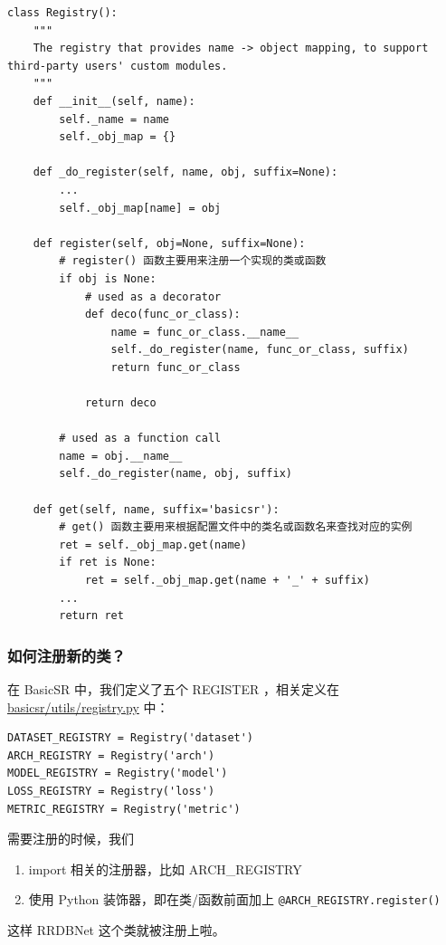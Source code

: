 \documentclass[../main.tex]{subfiles}
\begin{document}
\begin{verbatim}
class Registry():
    """
    The registry that provides name -> object mapping, to support third-party users' custom modules.
    """
    def __init__(self, name):
        self._name = name
        self._obj_map = {}

    def _do_register(self, name, obj, suffix=None):
        ...
        self._obj_map[name] = obj

    def register(self, obj=None, suffix=None):
        # register() 函数主要用来注册一个实现的类或函数
        if obj is None:
            # used as a decorator
            def deco(func_or_class):
                name = func_or_class.__name__
                self._do_register(name, func_or_class, suffix)
                return func_or_class

            return deco

        # used as a function call
        name = obj.__name__
        self._do_register(name, obj, suffix)

    def get(self, name, suffix='basicsr'):
        # get() 函数主要用来根据配置文件中的类名或函数名来查找对应的实例
        ret = self._obj_map.get(name)
        if ret is None:
            ret = self._obj_map.get(name + '_' + suffix)
        ...
        return ret
\end{verbatim}

\subsubsection{如何注册新的类？}

在 BasicSR 中，我们定义了五个 REGISTER ，相关定义在 \href{https://github.com/XPixelGroup/BasicSR/blob/master/basicsr/utils/registry.py}{basicsr/utils/registry.py} 中：
\begin{verbatim}
DATASET_REGISTRY = Registry('dataset')
ARCH_REGISTRY = Registry('arch')
MODEL_REGISTRY = Registry('model')
LOSS_REGISTRY = Registry('loss')
METRIC_REGISTRY = Registry('metric')
\end{verbatim}

需要注册的时候，我们
\begin{enumerate}
    \item import 相关的注册器，比如 ARCH\_REGISTRY
    \item 使用 Python 装饰器，即在类/函数前面加上 \texttt{@ARCH\_REGISTRY.register()}
\end{enumerate}
这样 RRDBNet 这个类就被注册上啦。
\end{document}
